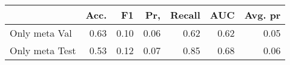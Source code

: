 \begin{tabular}{lrrrrrr}
\toprule
{} &  Acc. &    F1 &   Pr, &  Recall &   AUC &  Avg. pr \\
\midrule
Only meta Val  &  0.63 &  0.10 &  0.06 &    0.62 &  0.62 &     0.05 \\
Only meta Test &  0.53 &  0.12 &  0.07 &    0.85 &  0.68 &     0.06 \\
\bottomrule
\end{tabular}
